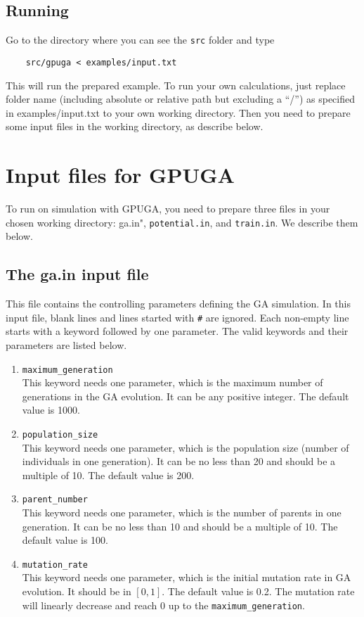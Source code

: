 \documentclass[12pt,a4paper]{report}
\begin{document}
\subsection{Running}

Go to the directory where you can see the \verb"src" folder and type
\begin{verbatim}
    src/gpuga < examples/input.txt
\end{verbatim}
This will run the prepared example. To run your own calculations, just replace folder name (including absolute or relative path but excluding a ``/'') as specified in examples/input.txt to your own working directory. Then you need to prepare some input files in the working directory, as describe below.

\section{Input files for GPUGA}

To run on simulation with GPUGA, you need to prepare three files in your chosen working directory: \verb''ga.in", \verb"potential.in", and \verb"train.in". We describe them below.

\subsection{The ga.in input file}

This file contains the controlling parameters defining the GA simulation. In this input file, blank lines and lines started with \verb"#" are ignored. Each non-empty line starts with a keyword followed by one parameter.  The valid keywords and their parameters are listed below.
\begin{enumerate}
\item  \verb"maximum_generation"\\
This keyword needs one parameter, which is the maximum number of generations in the GA evolution. It can be any positive integer. The default value is 1000.
\item  \verb"population_size" \\
This keyword needs one parameter, which is the population size (number of individuals in one generation). It can be no less than 20 and should be a multiple of 10. The default value is 200.
\item  \verb"parent_number"\\
This keyword needs one parameter, which is the number of parents in one generation. It can be no less than 10 and should be a multiple of 10. The default value is 100.
\item  \verb"mutation_rate"\\
This keyword needs one parameter, which is the initial mutation rate in GA evolution. It should be in $[0,1]$. The default value is 0.2. The mutation rate will linearly decrease and reach 0 up to the \verb"maximum_generation".
\end{enumerate}
\end{document}

